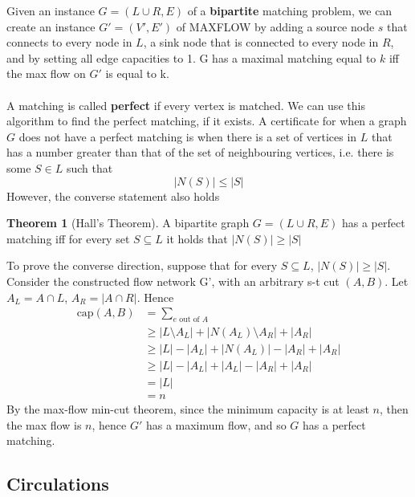 \documentclass{article}
\theoremstyle{plain}
\theoremstyle{definition}
\newtheorem{thm}{Theorem}
\begin{document}
        Given an instance $G = (L \cup R, E)$ of a \textbf{bipartite} matching problem, we can create an instance $G' = (V',E')$ of MAXFLOW by adding a source node $s$ that connects to every node in $L$, a sink node that is connected to every node in $R$, and by setting all edge capacities to 1. G has a maximal matching equal to $k$ iff the max flow on $G'$ is equal to k. \\ \\
        A matching is called \textbf{perfect} if every vertex is matched. We can use this algorithm to find the perfect matching, if it exists. A certificate for when a graph $G$ does not have a perfect matching is when there is a set of vertices in $L$ that has a number greater than that of the set of neighbouring vertices, i.e. there is some $S \in L$ such that 
        \[ |N(S)| \leq |S| \]
        However, the converse statement also holds
        \begin{thm}[Hall's Theorem]
            A bipartite graph $G = (L \cup R, E)$ has a perfect matching iff for every set $S \subseteq L$ it holds that $|N(S)| \geq |S|$
        \end{thm}
        To prove the converse direction, suppose that for every $S \subseteq L$, $|N(S)| \geq |S|$. Consider the constructed flow network G', with an arbitrary s-t cut $(A, B)$. Let $A_L = A \cap L$, $A_R = |A \cap R|$. Hence
        \begin{align*}
            \text{cap}(A, B) &= \sum_{e \text{ out of } A} \\ 
            &\geq |L \setminus A_L| + |N(A_L) \setminus A_R| + |A_R| \\
            &\geq |L| - |A_L| + |N(A_L)| - |A_R| + |A_R| \\ 
            &\geq |L| - |A_L| + |A_L| - |A_R| + |A_R|  \tag{by assumption} \\ 
            &= |L| \\
            &= n
        \end{align*}
        By the max-flow min-cut theorem, since the minimum capacity is at least $n$, then the max flow is $n$, hence $G'$ has a maximum flow, and so $G$ has a perfect matching. 
        
    \subsection{Circulations}
\end{document}
